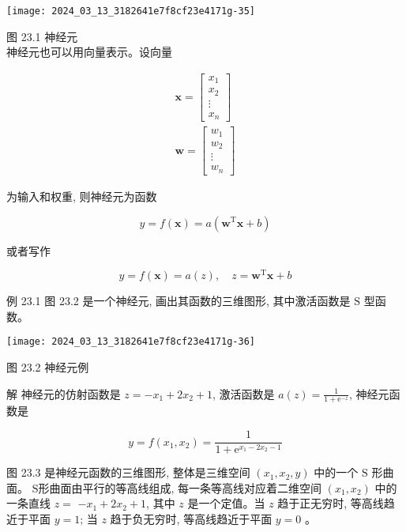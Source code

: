 \documentclass[10pt]{article}
\begin{document}
\begin{CJK*}{UTF8}{bsmi}
\begin{center}
\texttt{[image: 2024\_03\_13\_3182641e7f8cf23e4171g-35]}
\end{center}

图 23.1 神经元\\
神经元也可以用向量表示。设向量

$$
\begin{gathered}
\boldsymbol{x}=\left[\begin{array}{c}
x_{1} \\
x_{2} \\
\vdots \\
x_{n}
\end{array}\right] \\
\boldsymbol{w}=\left[\begin{array}{c}
w_{1} \\
w_{2} \\
\vdots \\
w_{n}
\end{array}\right]
\end{gathered}
$$

为输入和权重, 则神经元为函数


\begin{equation*}
y=f(\boldsymbol{x})=a\left(\boldsymbol{w}^{\mathrm{T}} \boldsymbol{x}+b\right) \tag{23.3}
\end{equation*}


或者写作


\begin{equation*}
y=f(\boldsymbol{x})=a(z), \quad z=\boldsymbol{w}^{\mathrm{T}} \boldsymbol{x}+b \tag{23.4}
\end{equation*}


例 23.1 图 23.2 是一个神经元, 画出其函数的三维图形, 其中激活函数是 $\mathrm{S}$ 型函数。

\begin{center}
\texttt{[image: 2024\_03\_13\_3182641e7f8cf23e4171g-36]}
\end{center}

图 23.2 神经元例

解 神经元的仿射函数是 $z=-x_{1}+2 x_{2}+1$, 激活函数是 $a(z)=\frac{1}{1+\mathrm{e}^{-z}}$, 神经元函数是

$$
y=f\left(x_{1}, x_{2}\right)=\frac{1}{1+\mathrm{e}^{x_{1}-2 x_{2}-1}}
$$

图 23.3 是神经元函数的三维图形, 整体是三维空间 $\left(x_{1}, x_{2}, y\right)$ 中的一个 $\mathrm{S}$ 形曲面。 $\mathrm{S}$形曲面由平行的等高线组成, 每一条等高线对应着二维空间 $\left(x_{1}, x_{2}\right)$ 中的一条直线 $z=$ $-x_{1}+2 x_{2}+1$, 其中 $z$ 是一个定值。当 $z$ 趋于正无穷时, 等高线趋近于平面 $y=1$; 当 $z$ 趋于负无穷时, 等高线趋近于平面 $y=0$ 。


\end{CJK*}
\end{document}
